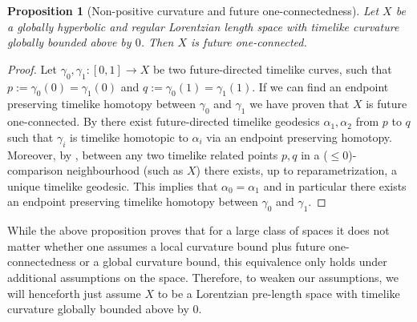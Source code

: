 \documentclass[11pt,reqno]{amsart}
\theoremstyle{definition}
\theoremstyle{definition}
\theoremstyle{plain}
\newtheorem{pop}[dfn]{Proposition}
\theoremstyle{remark}
\begin{document}
\begin{pop}[Non-positive curvature and future one-connectedness]
    Let $X$ be a globally hyperbolic and regular Lorentzian length space with timelike curvature globally bounded above by $0$. Then $X$ is future one-connected.
\end{pop}
\begin{proof}
    Let $\gamma_0,\gamma_1:[0,1]\to X$ be two future-directed timelike curves, such that $p:=\gamma_0(0)=\gamma_1(0)$ and $q:=\gamma_0(1)=\gamma_1(1)$. If we can find an endpoint preserving timelike homotopy between $\gamma_0$ and $\gamma_1$ we have proven that $X$ is future one-connected. By \cite[Proposition 4.6]{erös-gieger2025} there exist future-directed timelike geodesics $\alpha_1,\alpha_2$ from $p$ to $q$ such that $\gamma_i$ is timelike homotopic to $\alpha_i$ via an endpoint preserving homotopy. Moreover, by \cite[Proposition 2.3]{erös-gieger2025}, between any two timelike related points $p,q$ in a ($\leq 0$)-comparison neighbourhood (such as $X$) there exists, up to reparametrization, a unique timelike geodesic. This implies that $\alpha_0=\alpha_1$ and in particular there exists an endpoint preserving timelike homotopy between $\gamma_0$ and $\gamma_1$.
\end{proof}

While the above proposition proves that for a large class of spaces it does not matter whether one assumes a local curvature bound plus future one-connectedness or a global curvature bound, this equivalence only holds under additional assumptions on the space. Therefore, to weaken our assumptions, we will henceforth just assume $X$ to be a Lorentzian pre-length space with timelike curvature globally bounded above by $0$. 
\end{document}
